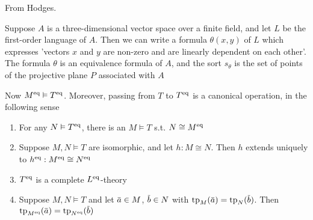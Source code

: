 \documentclass[11pt]{article}
\begin{document}
\begin{examplle}
From Hodges.

Suppose \(A\) is a three-dimensional vector space over a finite field, and let \(L\) be the
first-order language of \(A\). Then we can write a formula \(\theta(x,y)\) of \(L\) which expresses
'vectors \(x\) and \(y\) are non-zero and are linearly dependent on each other'. The formula
\(\theta\) is an equivalence formula of \(A\), and the sort \(s_\theta\) is the set of points of the
projective plane \(P\) associated with \(A\)
\end{examplle}

Now \(M^{\operatorname{eq}}\vDash T^{\operatorname{eq}}\). Moreover, passing from \(T\) to \(T^{\operatorname{eq}}\) is a canonical operation,
in the following sense
\begin{lemma}[]
\begin{enumerate}
\item For any \(N\vDash T^{\operatorname{eq}}\), there is an \(M\vDash T\) s.t. \(N\cong M^{\operatorname{eq}}\)
\item Suppose \(M,N\vDash T\) are isomorphic, and let \(h:M\cong N\). Then \(h\) extends uniquely
to \(h^{\operatorname{eq}}:M^{\operatorname{eq}}\cong N^{\operatorname{eq}}\)
\item \(T^{\operatorname{eq}}\) is a complete \(L^{\operatorname{eq}}\)-theory
\item Suppose \(M,N\vDash T\) and let \(\bara\in M\), \(\barb\in N\) with \(\tp_M(\bara)=\tp_N(\barb)\).
Then \(\tp_{M^{\eq}}(\bara)=\tp_{N^{\eq}}(\barb)\)
\end{enumerate}
\end{lemma}
\end{document}
